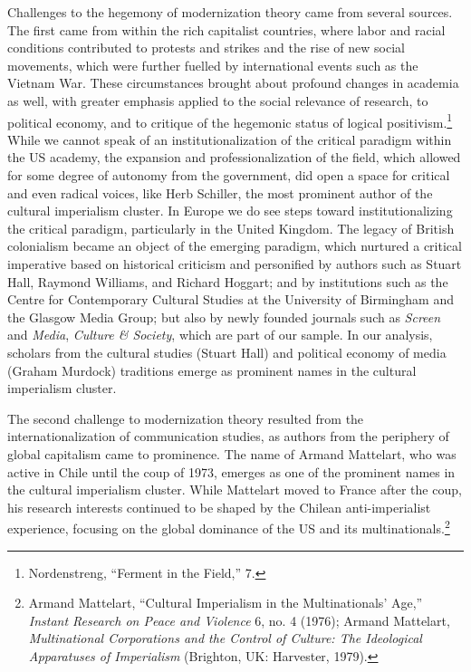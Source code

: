 \documentclass{tufte-handout}
\begin{document}
Challenges to the hegemony of modernization theory came from several
sources. The first came from within the rich capitalist countries, where
labor and racial conditions contributed to protests and strikes and the
rise of new social movements, which were further fuelled by
international events such as the Vietnam War. These circumstances
brought about profound changes in academia as well, with greater
emphasis applied to the social relevance of research, to political
economy, and to critique of the hegemonic status of logical
positivism.\footnote{Nordenstreng, ``Ferment in the Field,'' 7.} While
we cannot speak of an institutionalization of the critical paradigm
within the US academy, the expansion and professionalization of the
field, which allowed for some degree of autonomy from the government,
did open a space for critical and even radical voices, like Herb
Schiller, the most prominent author of the cultural imperialism cluster.
In Europe we do see steps toward institutionalizing the critical
paradigm, particularly in the United Kingdom. The legacy of British
colonialism became an object of the emerging paradigm, which nurtured a
critical imperative based on historical criticism and personified by
authors such as Stuart Hall, Raymond Williams, and Richard Hoggart; and
by institutions such as the Centre for Contemporary Cultural Studies at
the University of Birmingham and the Glasgow Media Group; but also by
newly founded journals such as \emph{Screen} and \emph{Media},
\emph{Culture \& Society}, which are part of our sample. In our
analysis, scholars from the cultural studies (Stuart Hall) and political
economy of media (Graham Murdock) traditions emerge as prominent names
in the cultural imperialism cluster.

The second challenge to modernization theory resulted from the
internationalization of communication studies, as authors from the
periphery of global capitalism came to prominence. The name of Armand
Mattelart, who was active in Chile until the coup of 1973, emerges as
one of the prominent names in the cultural imperialism cluster. While
Mattelart moved to France after the coup, his research interests
continued to be shaped by the Chilean anti-imperialist experience,
focusing on the global dominance of the US and its
multinationals.\footnote{Armand Mattelart, ``Cultural Imperialism in the
  Multinationals' Age,'' \emph{Instant Research on Peace and Violence}
  6, no. 4 (1976); Armand Mattelart, \emph{Multinational Corporations
  and the Control of Culture: The Ideological Apparatuses of
  Imperialism} (Brighton, UK: Harvester, 1979).}
\end{document}
